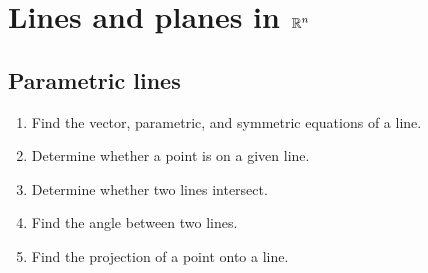 \chapter{Lines and planes in \texorpdfstring{$\mathbb{R}^{n}$}{Rn}}

\section{Parametric lines}

\begin{outcome}
  \begin{enumerate}
  \item Find the vector, parametric, and symmetric equations of a line.
  \item Determine whether a point is on a given line.
  \item Determine whether two lines intersect.
  \item Find the angle between two lines.
  \item Find the projection of a point onto a line.
  \end{enumerate}
\end{outcome}

